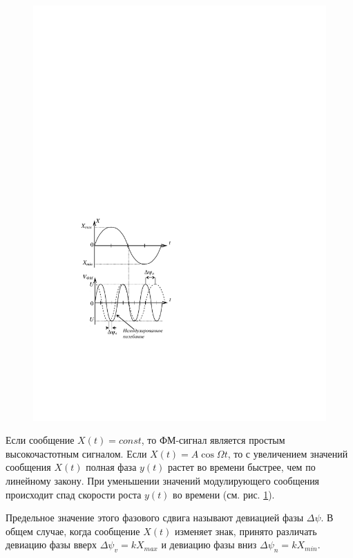 \begin{figure} 
	\vspace{-2ex}
	\centering
	\includegraphics[]{fig/fig2-1}
	\vspace{-1em}
	\caption{}
	\label{fig:2.1}
\end{figure}

Если сообщение $X(t)=const$, то ФМ-сигнал является простым высокочастотным сигналом.
Если $X(t)=A\cos\Omega t$, то с увеличением значений сообщения $X(t)$ полная фаза $y(t)$ растет во времени быстрее, чем по линейному закону. При уменьшении значений модулирующего сообщения происходит спад скорости роста $y(t)$ во времени (см. рис. \ref{fig:2.1}).



Предельное значение этого фазового сдвига называют девиацией фазы $\Delta \psi$. В общем случае, когда сообщение $X(t)$ изменяет знак, принято различать девиацию фазы вверх $\Delta \psi_v =kX_{max}$ и девиацию фазы вниз $\Delta \psi_n =kX_{min}$.

